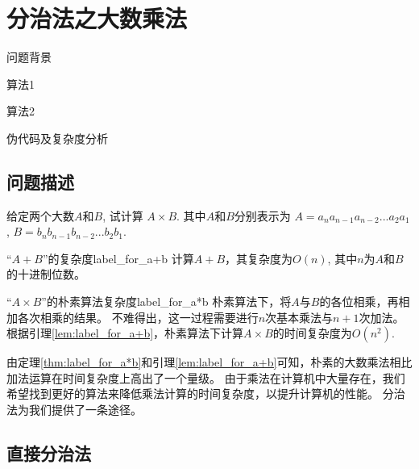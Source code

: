 \chapter{分治法之大数乘法}
\begin{introduction}
    \item 问题背景
    \item 算法1
    \item 算法2
    \item 伪代码及复杂度分析
\end{introduction}

\section{问题描述}
给定两个大数$A$和$B$, 试计算
\begin{math}
    A \times B
\end{math}.
其中$A$和$B$分别表示为
\begin{math}
    A = a_n a_{n-1} a_{n-2} ... a_2 a_1
\end{math}
,
\begin{math}
    B = b_n b_{n-1} b_{n-2} ... b_2 b_1
\end{math}.

\begin{lemma}{“$A + B$”的复杂度}{label_for_a+b}
    计算$A + B$，其复杂度为$O(n)$, 其中$n$为$A$和$B$的十进制位数。
\end{lemma}
\begin{theorem}{“$A \times B$”的朴素算法复杂度}{label_for_a*b}
    朴素算法下，将$A$与$B$的各位相乘，再相加各次相乘的结果。
    不难得出，这一过程需要进行$n$次基本乘法与$n+1$次加法。
    根据引理\ref{lem:label_for_a+b}，朴素算法下计算$A \times B$的时间复杂度为$O(n^2)$.
\end{theorem}
由定理\ref{thm:label_for_a*b}和引理\ref{lem:label_for_a+b}可知，朴素的大数乘法相比加法运算在时间复杂度上高出了一个量级。
由于乘法在计算机中大量存在，我们希望找到更好的算法来降低乘法计算的时间复杂度，以提升计算机的性能。
分治法为我们提供了一条途径。
\section{直接分治法}
